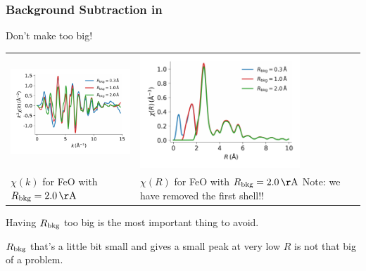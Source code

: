 \begin{frame} \frametitle{Background Subtraction in {\xasviewer}  }


  \begin{cenpage}{130mm}


Don't make  too big!

\begin{tabular}{ll}
  \begin{minipage}{65mm}
    \includegraphics[width=60mm]{figs/experiment/bkg_ksp2}
  \end{minipage} &
  \begin{minipage}{55mm}
    \includegraphics[width=60mm]{figs/experiment/bkg_rsp2}
  \end{minipage} \\
  \begin{minipage}{55mm}
    $\chi(k)$ for FeO with $R_{\rm bkg}=2.0\, \rm \AA$
  \end{minipage} &
  \begin{minipage}{55mm}
    $\chi(R)$ for FeO with $R_{\rm bkg}=2.0\, \rm \AA$  Note: we have
    removed the first shell!!

  \end{minipage} \\
\end{tabular}

\vmm

    \vmm
    Having $R_{\rm bkg}$ too big is the most important thing to avoid.

    \vmm

    $R_{\rm bkg}$  that's a little bit small  and gives a small peak at
    very low $R$ is not that big of a problem.

    \end{cenpage}
\vfill


\end{frame}
